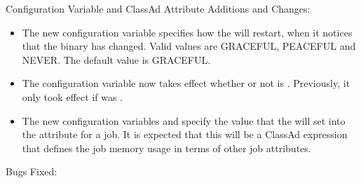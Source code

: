 \noindent Configuration Variable and ClassAd Attribute Additions and Changes:

\begin{itemize}

\item The new configuration variable  
specifies how the  will restart,
when it notices that the 
binary has changed. Valid values are GRACEFUL, PEACEFUL and NEVER. 
The default value is GRACEFUL.

\item The configuration variable  now takes effect
whether or not  is .  Previously,
it only took effect if  was .

\item The new configuration variables  and
 specify the value that the  will
set into the  attribute for a job.  It is expected that
this will be a ClassAd expression that defines the job memory usage in terms
of other job attributes.

\end{itemize}

\noindent Bugs Fixed:

